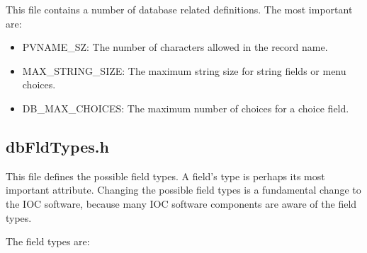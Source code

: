 This file contains a number of database related definitions. The most important are:

\begin{itemize}\item {}PVNAME\_SZ:  The number of characters allowed in the record name.

\item {}MAX\_STRING\_SIZE:  The maximum string size for string fields or menu choices.

\item {}DB\_MAX\_CHOICES:  The maximum number of choices for a choice field.

\end{itemize}\subsection{dbFldTypes.h}

This file defines the possible field types. A field's type is perhaps its most important attribute. Changing the possible field 
types is a fundamental change to the IOC software, because many IOC software components are aware of the field types.

The field types are:

